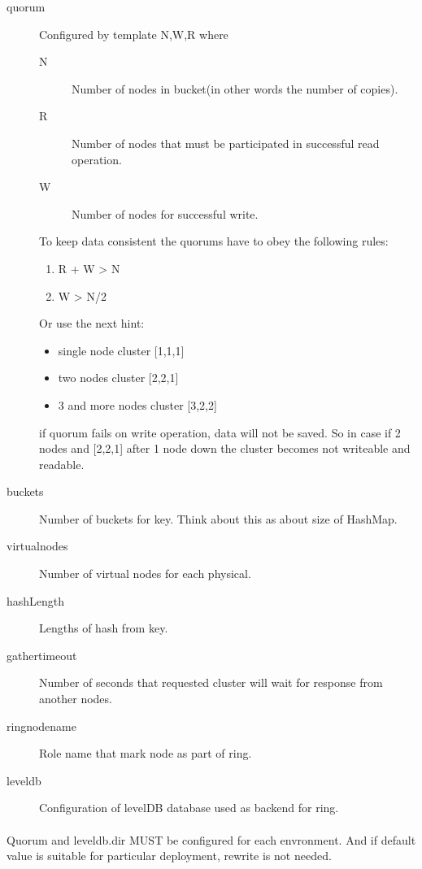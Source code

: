 \begin{description}
\item[quorum] Configured by template N,W,R where

\begin{description}
\item[N] Number of nodes in bucket(in other words the number of copies).
\item[R] Number of nodes that must  be participated in successful read operation.
\item[W] Number of nodes for successful write.
\end{description}

To keep data consistent the quorums have to obey the following rules:
\begin{enumerate}
\item R + W > N
\item W > N/2
\end{enumerate}

Or use the next hint:
\begin{itemize}
\item single node cluster [1,1,1]
\item two nodes cluster [2,2,1]
\item 3 and more nodes cluster [3,2,2]
\end{itemize}

if quorum fails on write operation, data will not be saved.
So in case if 2 nodes and [2,2,1] after 1 node down the cluster becomes not writeable and readable.
\item[buckets] Number of buckets for key. Think about this as about size of HashMap.
\item[virtual\-nodes] Number of virtual nodes for each physical.
\item[hashLength] Lengths of hash from key.
\item[gather\-timeout] Number of seconds that requested cluster will wait for response from another nodes.
\item[ring\-node\-name] Role name that mark node as part of ring.
\item[leveldb] Configuration of levelDB database used as backend for ring.
\end{description}

\paragraph{}
Quorum and leveldb.dir MUST be configured for each envronment.
And if default value is suitable for particular deployment, rewrite is not needed.


